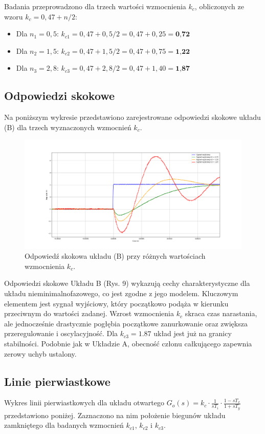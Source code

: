 \documentclass[12pt,a4paper]{article}
\begin{document}
	Badania przeprowadzono dla trzech wartości wzmocnienia \(k_c\), obliczonych ze wzoru \(k_c = 0,47 + n/2\):
	\begin{itemize}
		\item Dla \(n_1 = 0,5\): $k_{c1} = 0,47 + 0,5 / 2 = 0,47 + 0,25 = \textbf{0,72}$
		\item Dla \(n_2 = 1,5\): $k_{c2} = 0,47 + 1,5 / 2 = 0,47 + 0,75 = \textbf{1,22}$
		\item Dla \(n_3 = 2,8\): $k_{c3} = 0,47 + 2,8 / 2 = 0,47 + 1,40 = \textbf{1,87}$
	\end{itemize}
	
	\subsection{Odpowiedzi skokowe}
	Na poniższym wykresie przedstawiono zarejestrowane odpowiedzi skokowe układu (B) dla trzech wyznaczonych wzmocnień \(k_c\).
	
	\begin{figure}[H]
	\centering
	\includegraphics[width=1\linewidth]{zdjecia/OdpSkokB.png}
	\caption{Odpowiedź skokowa układu (B) przy różnych wartościach wzmocnienia \(k_c\).}
	\label{fig:OdpSkokB}
	\end{figure}
	
	Odpowiedzi skokowe Układu B (Rys. 9) wykazują cechy charakterystyczne dla układu nieminimalnofazowego, co jest zgodne z jego modelem. Kluczowym elementem jest sygnał wyjściowy, który początkowo podąża w kierunku przeciwnym do wartości zadanej. Wzrost wzmocnienia $k_c$ skraca czas narastania, ale jednocześnie drastycznie pogłębia początkowe zanurkowanie oraz zwiększa przeregulowanie i oscylacyjność. Dla $k_{c3}=1.87$ układ jest już na granicy stabilności. Podobnie jak w Układzie A, obecność członu całkującego zapewnia zerowy uchyb ustalony.
	
	\subsection{Linie pierwiastkowe}
	Wykres linii pierwiastkowych dla układu otwartego \(G_o(s) = k_c \cdot \frac{1}{sT_i} \cdot
	\frac{1-sT_x}{1+sT_y}\) przedstawiono poniżej. Zaznaczono na nim położenie biegunów układu zamkniętego dla badanych wzmocnień \(k_{c1}\), \(k_{c2}\) i \(k_{c3}\).
	
\end{document}
